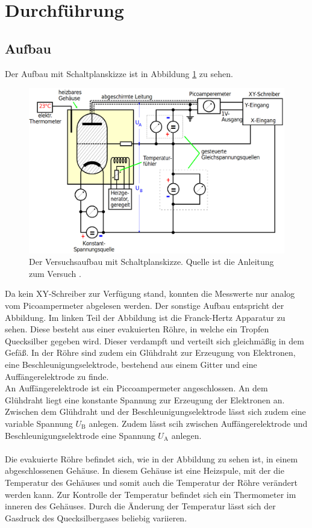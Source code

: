 \section{Durchführung}
\label{sec:Durchführung}

\subsection{Aufbau}
Der Aufbau mit Schaltplanskizze ist in Abbildung \ref{fig:aufbau} zu sehen.
\begin{figure}
    \centering
    \includegraphics[width=\textwidth]{content/data/aufbau.png}
    \caption{Der Versuchsaufbau mit Schaltplanskizze. Quelle ist die Anleitung zum Versuch \cite[10]{anleitung}.}
    \label{fig:aufbau}
\end{figure}
Da kein XY-Schreiber zur Verfügung stand, konnten die Messwerte nur analog vom Picoampermeter abgelesen werden.
Der sonstige Aufbau entspricht der Abbildung.
Im linken Teil der Abbildung ist die Franck-Hertz Apparatur zu sehen.
Diese besteht aus einer evakuierten Röhre, in welche ein Tropfen Quecksilber gegeben wird.
Dieser verdampft und verteilt sich gleichmäßig in dem Gefäß.
In der Röhre sind zudem ein Glühdraht zur Erzeugung von Elektronen, eine Beschleunigungselektrode, bestehend aus einem Gitter und eine Auffängerelektrode zu finde.
\\
An Auffängerelektrode ist ein Piccoampermeter angeschlossen.
An dem Glühdraht liegt eine konstante Spannung zur Erzeugung der Elektronen an.
Zwischen dem Glühdraht und der Beschleunigungselektrode lässt sich zudem eine variable Spannung $U_\text{B}$ anlegen.
Zudem lässt scih zwischen Auffängerelektrode und Beschleunigungselektrode eine Spannung $U_\text{A}$ anlegen.
\\\\
Die evakuierte Röhre befindet sich, wie in der Abbildung zu sehen ist, in einem abgeschlossenen Gehäuse.
In diesem Gehäuse ist eine Heizspule, mit der die Temperatur des Gehäuses und somit auch die Temperatur der Röhre verändert werden kann.
Zur Kontrolle der Temperatur befindet sich ein Thermometer im inneren des Gehäuses.
Durch die Änderung der Temperatur lässt sich der Gasdruck des Quecksilbergases beliebig variieren.

